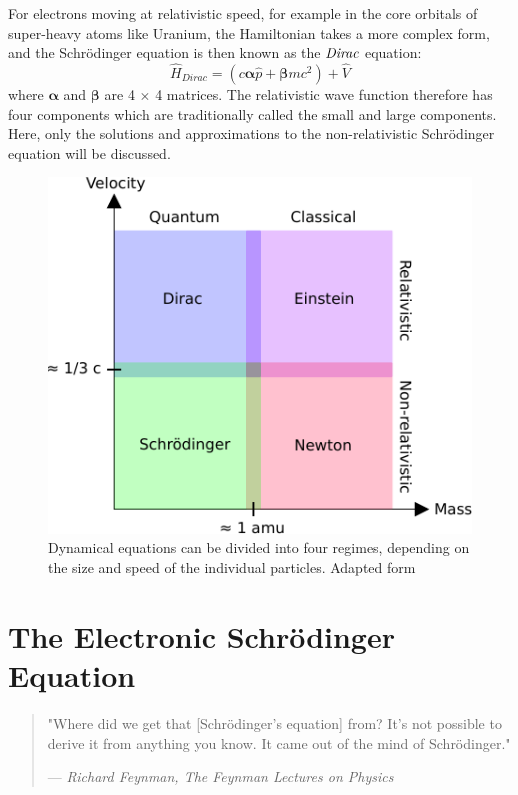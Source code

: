 For electrons moving at relativistic speed, for example in the core orbitals of super-heavy atoms like Uranium, the Hamiltonian takes a more complex form, and the Schrödinger equation is then known as the $\emph{Dirac}$ equation:
\begin{equation}
\hat{H}_{Dirac} = \left(c\boldsymbol{\alpha} \hat{p} + \boldsymbol{\beta}mc^2\right) + \hat{V}
\end{equation}
\noindent where $\boldsymbol{\alpha}$ and $\boldsymbol{\beta}$ are 4 $\times$ 4 matrices. The relativistic wave function therefore has four components which are traditionally called the small and large components. Here, only the solutions and approximations to the non-relativistic Schrödinger equation will be discussed.

\begin{figure}
\centering
\includegraphics[scale=1.0]{Pics/dyneq}
\caption[Four regimes of dynamical equations]{Dynamical equations can be divided into four regimes, depending on the size and speed of the individual particles. Adapted form \cite{Jen2017}}
\label{fig:REGIMES}
\end{figure}

\section{The Electronic Schrödinger Equation}

\begin{quote}
  "Where did we get that [Schrödinger's equation] from? It's not possible to derive it from anything you know. It came out of the mind of Schrödinger."
  \begin{flushright}
    \small{--- \textit{Richard Feynman, The Feynman Lectures on Physics}}
  \end{flushright}
\end{quote}

